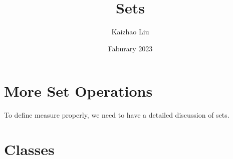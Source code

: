 \documentclass{article}
\title{Sets}
\author{Kaizhao Liu}
\date{Faburary 2023}
\theoremstyle{definition}
\begin{document}
\maketitle
\tableofcontents



\section{More Set Operations}
To define measure properly, we need to have a detailed discussion of sets.



\section{Classes}
\end{document}
